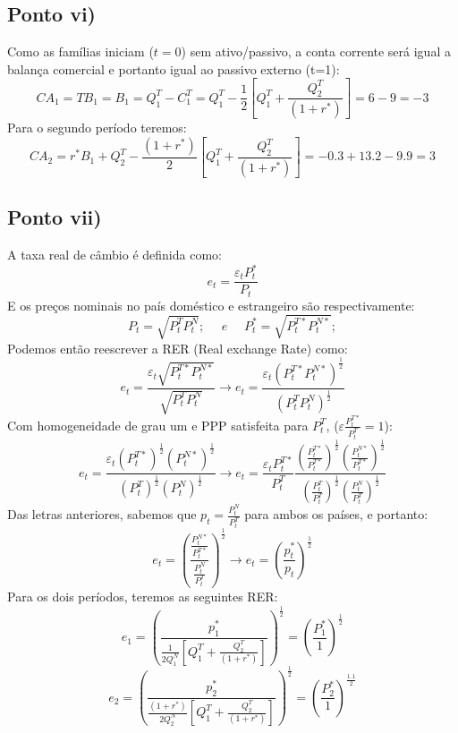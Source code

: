 \documentclass{article}
\begin{document}
\subsection*{Ponto vi)}
Como as famílias iniciam ($t=0$) sem ativo/passivo, a conta corrente será igual a balança comercial e portanto igual ao passivo externo (t=1):
\begin{equation*}
    CA_1=TB_1=B_1=Q_1^T-C_1^T=Q_1^T-\frac{1}{2}\left[Q_1^T + \frac{Q_2^T}{(1+r^*)}\right]=6-9=-3
\end{equation*}
Para o segundo período teremos:
\begin{equation*}
    CA_2=r^*B_1+Q_2^T-\frac{(1+r^*)}{2}\left[Q_1^T + \frac{Q_2^T}{(1+r^*)}\right]=-0.3+13.2-9.9=3
\end{equation*}
\subsection*{Ponto vii)}
A taxa real de câmbio é definida como:
$$e_t=\frac{\varepsilon_t P_t^*}{P_t}$$
E os preços nominais no país doméstico e estrangeiro são respectivamente:
\begin{equation*}
    P_t=\sqrt{P_t^{T} P_t^{N}}; \>\>\>\>\>\> \textit{e} \>\>\>\>\>\> P_t^*=\sqrt{P_t^{T*} P_t^{N*}}; 
\end{equation*}
Podemos então reescrever a RER (Real exchange Rate) como:
\begin{equation*}
    e_t= \frac{\varepsilon_t \sqrt{P_t^{T*} P_t^{N*}}}{\sqrt{P_t^{T} P_t^{N}}} \to e_t= \frac{\varepsilon_t \left(P_t^{T*} P_t^{N*}\right)^\frac{1}{2}}{\left(P_t^{T} P_t^{N}\right)^\frac{1}{2}}
\end{equation*}
Com homogeneidade de grau um e PPP satisfeita para $P_t^T$, ($\varepsilon \frac{P_t^{T*}}{P_t^T}=1$):
\begin{equation*}
    e_t= \frac{\varepsilon_t (P_t^{T*})^\frac{1}{2} (P_t^{N*})^\frac{1}{2}}{(P_t^{T})^\frac{1}{2} (P_t^{N})^\frac{1}{2}} \to e_t= \frac{\varepsilon_t P_t^{T*}}{P_t^T}\frac{\left(\frac{P_t^{T*}}{ P_t^{T*}}\right)^\frac{1}{2} \left(\frac{P_t^{N*}}{P_t^{T*}}\right)^\frac{1}{2}}{\left(\frac{P_t^{T}}{P_t^T}\right)^\frac{1}{2} \left(\frac{P_t^{N}}{P_t^T}\right)^\frac{1}{2}}
\end{equation*}
Das letras anteriores, sabemos que $p_t=\frac{P_t^N}{P_t^T}$ para ambos os países, e portanto:
\begin{equation*}
    e_t= \left(\frac{\frac{P_t^{N*}}{P_t^{T*}}}{\frac{P_t^{N}}{P_t^T}}\right)^\frac{1}{2} \to
    e_t= \left(\frac{p_t^*}{p_t}\right)^\frac{1}{2}
\end{equation*}
Para os dois períodos, teremos as seguintes RER:
\begin{equation*}
    e_1= \left(\frac{p_1^*}{\frac{1}{2Q_1^N}\left[Q_1^T + \frac{Q_2^T}{(1+r^*)}\right]}\right)^\frac{1}{2} = \left(\frac{P_1^*}{1}\right)^\frac{1}{2}
\end{equation*}
\begin{equation*}
    e_2= \left(\frac{p_2^*}{\frac{(1+r^*)}{2Q_2^N}\left[Q_1^T + \frac{Q_2^T}{(1+r^*)}\right]}\right)^\frac{1}{2} = \left(\frac{P_2^*}{1}\right)^\frac{1.1}{2}
\end{equation*}
\end{document}

